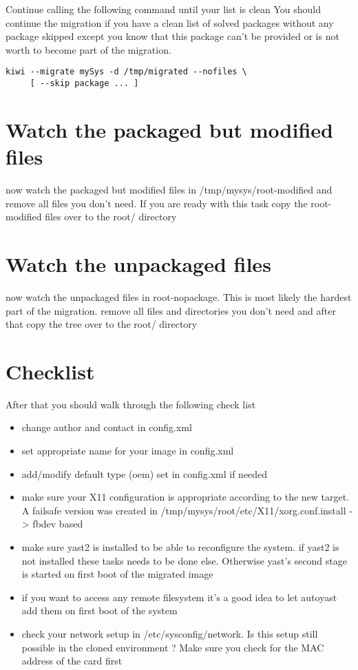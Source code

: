 Continue calling the following command until your list is clean
You should continue the migration if you have a clean list of solved
packages without any package skipped except you know that this package
can't be provided or is not worth to become part of the migration.

\begin{Command}{14cm}
\begin{verbatim}
kiwi --migrate mySys -d /tmp/migrated --nofiles \
     [ --skip package ... ]
\end{verbatim}
\end{Command}

\section{Watch the packaged but modified files}
now watch the packaged but modified files in /tmp/mysys/root-modified
and remove all files you don't need. If you are ready with this task
copy the root-modified files over to the root/ directory

\section{Watch the unpackaged files}
now watch the unpackaged files in root-nopackage. This is most likely
the hardest part of the migration. remove all files and directories
you don't need and after that copy the tree over to the root/ directory

\section{Checklist}
After that you should walk through the following check list

\begin{itemize}
\item change author and contact in config.xml
\item set appropriate name for your image in config.xml
\item add/modify default type (oem) set in config.xml if needed
\item make sure your X11 configuration is appropriate according to
      the new target. A failsafe version was created in
      /tmp/mysys/root/etc/X11/xorg.conf.install -> fbdev based
\item make sure yast2 is installed to be able to reconfigure
      the system. if yast2 is not installed these tasks needs to
      be done else. Otherwise yast's second stage is started on first
      boot of the migrated image
\item if you want to access any remote filesystem it's a good
      idea to let autoyast add them on first boot of the system
\item check your network setup in /etc/sysconfig/network. Is this
      setup still possible in the cloned environment ? Make sure you
      check for the MAC address of the card first
\end{itemize}

